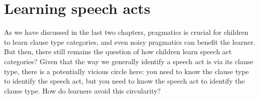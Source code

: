 \chapter{Learning speech acts}
\label{chap:eng-sp}

As we have discussed in the last two chapters, pragmatics is crucial for children to learn clause type categories, and even noisy pragmatics can benefit the learner. But then, there still remains the question of how children learn speech act categories? Given that the way we generally identify a speech act is via its clause type, there is a potentially vicious circle here: you need to know the clause type to identify the speech act, but you need to know the speech act to identify the clause type. How do learners avoid this circularity? 





